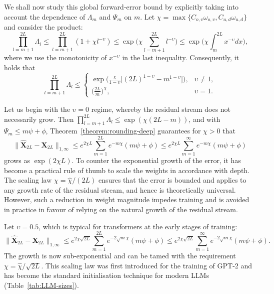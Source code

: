 \documentclass[namedate,webpdf,imanum]{ima-authoring-template}
\newcommand{\Matrix}[1]{\mathbf{#1}}
\newcommand{\Norm}[3][]{#1\| #2 #1\|_{\mathrm{#3}}}
\numberwithin{equation}{section}
\begin{document}
We shall now study this global forward-error bound by explicitly taking into account the dependence of $\Lambda_m$ and $\Psi_m$ on $m$.
Let $\chi = \max\{ C_{o,v} \omega_{o,v}, C_{u,d} \omega_{u,d} \}$ and consider the product:
\begin{equation*}
    \prod_{l = m + 1}^{2L} \Lambda_i \leq \prod_{l = m + 1}^{2L} (1 + \chi l^{-\upsilon}) \leq \exp\Big( \chi \sum_{l = m + 1}^{2L} l^{-\upsilon} \Big) \leq \exp \Big( \chi \int_{m}^{2L} x^{-\upsilon} dx \Big),
\end{equation*}
where we use the monotonicity of $x^{-\upsilon}$ in the last inequality.
Consequently, it holds that
\begin{equation*}
    \prod_{l = m + 1}^{2L} \Lambda_l \leq \begin{cases}
        \exp\Big( \frac{\chi}{1 - \upsilon} \big[ (2L)^{1 - \upsilon} - m^{1 - \upsilon} \big] \Big), & \upsilon \neq 1, \\
        \Big( \frac{2L}{m} \Big)^{\chi}, & \upsilon = 1.
    \end{cases}
\end{equation*}

Let us begin with the $\upsilon = 0$ regime, whereby the residual stream does not necessarily grow.
Then $\prod_{l = m + 1}^{2L} \Lambda_l \leq \exp( \chi (2L - m))$, and with $\Psi_m \leq m \psi + \phi$, Theorem~\ref{theorem:rounding-deep} guarantees for $\chi > 0$ that
\begin{equation*}
    \Norm{\Matrix{\hat{X}}_{2L} - \Matrix{X}_{2L}}{1, \infty} \leq e^{2 \chi L} \sum_{m = 1}^{2L} e^{-m \chi} (m \psi + \phi) \leq e^{2 \chi L} \sum_{m = 1}^{\infty} e^{-m \chi} (m \psi + \phi)
\end{equation*}
grows as $\exp(2 \chi L)$.
To counter the exponential growth of the error, it has become a practical rule of thumb to scale the weights in accordance with depth.
The scaling law $\chi = \hat{\chi} / (2L)$ ensures that the error is bounded and applies to any growth rate of the residual stream, and hence is theoretically universal.
However, such a reduction in weight magnitude impedes training and is avoided in practice in favour of relying on the natural growth of the residual stream.

Let $\upsilon = 0.5$, which is typical for transformers at the early stages of training:
\begin{equation*}
    \Norm{\Matrix{\hat{X}}_{2L} - \Matrix{X}_{2L}}{1, \infty} \leq e^{2 \chi \sqrt{2L}} \sum_{m = 1}^{2L} e^{-2 \sqrt{m} \chi} (m \psi + \phi) \leq e^{2 \chi \sqrt{2L}} \sum_{m = 1}^{\infty} e^{-2 \sqrt{m} \chi} (m \psi + \phi).
\end{equation*}
The growth is now sub-exponential and can be tamed with the requirement $\chi = \hat{\chi} / \sqrt{2L}$.
This scaling law was first introduced for the training of GPT-2 \citep{radford2019language} and has become the standard initialisation technique for modern LLMs (Table~\ref{tab:LLM-sizes}).
\end{document}
